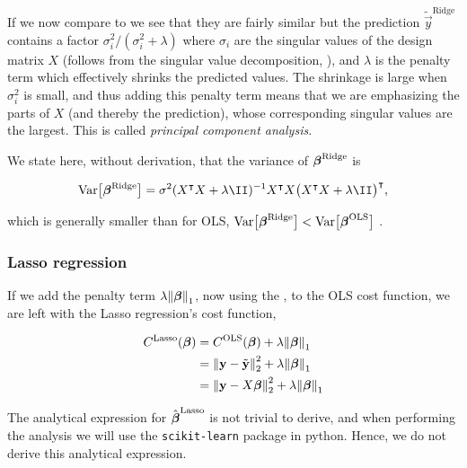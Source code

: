 If we now compare  to  we see that they are fairly similar but the prediction $\tilde{\vec{y}}^{\text{Ridge}}$ contains a factor $\sigma_i^2/(\sigma_i^2 + \lambda)$ where $\sigma_i$ are the singular values of the design matrix $X$ (follows from the singular value decomposition, ), and $\lambda$ is the penalty term which effectively shrinks the predicted values. The shrinkage is large when $\sigma_i^2$ is small, and thus adding this penalty term means that we are emphasizing the parts of $X$ (and thereby the prediction), whose corresponding singular values are the largest. This is called \textit{principal component analysis}.


We state here, without derivation, that the variance of $\boldsymbol{\beta}^\text{Ridge}$ is 

\begin{align*}
    \variance{\svec{\beta}^\text{Ridge}} = \sigma^2 (\hessian + \lambda\II )^{-1} \hessian \big(\hessian + \lambda \II\big)\TT,
\end{align*}

which is generally smaller than for OLS, $\text{Var}\big[\boldsymbol{\beta}^\text{Ridge}\big] <\text{Var}\big[\boldsymbol{\beta}^\text{OLS}\big]$ \citep{mhjensen}.



\subsubsection{Lasso regression}\label{sec:Lasso}

If we add the penalty term $\lambda \norm{\boldsymbol{\beta}}_1$, now using the \footnotemark, to the OLS cost function, we are left with the Lasso regression's cost function,

\begin{align*}
    C^\text{Lasso}(\boldsymbol{\beta})  &= C^\text{OLS}(\boldsymbol{\beta}) + \lambda \norm{\boldsymbol{\beta}}_1 \\
    &= \norm{\mathbf{y}-\tilde{\mathbf{y}}}_2^{2}  + \lambda \norm{\boldsymbol{\beta}}_{1} \\
    &= \norm{\mathbf{y}-X\boldsymbol{\beta}}_2^{2} + \lambda \norm{\boldsymbol{\beta}}_{1}
\end{align*}

The analytical expression for $\hat{\boldsymbol{\beta}}^{\text{Lasso}}$ is not trivial to derive, and when performing the analysis we will use the \texttt{scikit-learn} package in python. Hence, we do not derive this analytical expression. 

